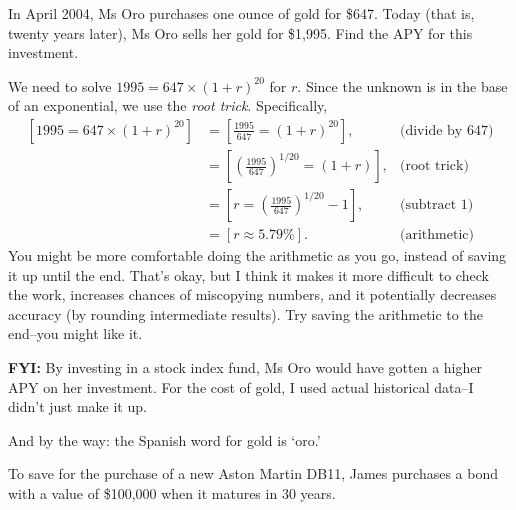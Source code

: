 \documentclass[12pt,fleqn,answers]{exam}
\begin{document}
\begin{questions}
\question [2] In April 2004, Ms Oro purchases one ounce of gold for \$647. 
Today (that is, twenty years later), Ms Oro sells her gold for \$1,995.
Find the APY for this investment.
\begin{solution}[3.0in]
We need to solve $1995 = 647 \times (1+r)^{20}$ for $r$. Since 
the unknown is in the base of an exponential, we use the \emph{root trick}.
Specifically,
\begin{align*}
    \left[1995 = 647 \times (1+r)^{20} \right] &= \left[\frac{1995}{647} = (1+r)^{20} \right], & \mbox{(divide by 647)}\\
               &= \left[\left(\frac{1995}{647}\right)^{1/20} = (1+r) \right], & \mbox{(root trick)} \\
               &= \left[r = \left(\frac{1995}{647}\right)^{1/20} - 1 \right], & \mbox{(subtract 1)}\\
               &= \left[ r \approx 5.79\% \right]. &\mbox{(arithmetic)}
\end{align*}
You might be more comfortable doing the arithmetic as you go, instead
of saving it up until the end. That's okay, but I think it makes it
more difficult to check the work, increases chances of miscopying
numbers, and it potentially decreases accuracy (by rounding intermediate results).
Try saving the arithmetic to the end--you might like it.

\textbf{FYI:} By investing in a stock index fund, Ms Oro would have
gotten a higher APY on her investment. For the cost of gold, I used 
actual historical data--I didn't just make it up.

And by the way: the Spanish word for gold is `oro.'


\end{solution}


\question To save for the purchase of a new Aston Martin DB11,
James purchases a bond with a value of \$100,000 when it matures
in 30 years.

\end{questions}
\end{document}
